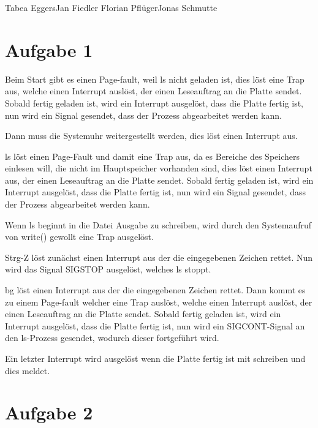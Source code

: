 \documentclass{ti2}
\begin{document}
%
                {Tabea Eggers}{Jan Fiedler}%
                {Florian Pflüger}{Jonas Schmutte}%


\section*{Aufgabe 1}
Beim Start gibt es einen Page-fault, weil ls nicht geladen ist, dies löst eine Trap aus, welche einen Interrupt auslöst, der einen Leseauftrag an die Platte sendet. Sobald fertig geladen ist, wird ein Interrupt ausgelöst, dass die Platte fertig ist, nun wird ein Signal gesendet, dass der Prozess abgearbeitet werden kann.%

Dann muss die Systemuhr weitergestellt werden, dies löst einen Interrupt aus. %

ls löst einen Page-Fault und damit eine Trap aus, da es Bereiche des Speichers einlesen will, die nicht im Hauptspeicher vorhanden sind, dies löst einen Interrupt aus, der einen Leseauftrag an die Platte sendet. Sobald fertig geladen ist, wird ein Interrupt ausgelöst, dass die Platte fertig ist, nun wird ein Signal gesendet, dass der Prozess abgearbeitet werden kann.%

Wenn ls beginnt in die Datei Ausgabe zu schreiben, wird durch den Systemaufruf von write() gewollt eine Trap ausgelöst.

Strg-Z löst zunächst einen Interrupt aus der die eingegebenen Zeichen rettet. Nun wird das Signal SIGSTOP ausgelöst, welches ls stoppt. %

bg löst einen Interrupt aus der die eingegebenen Zeichen rettet. Dann kommt es zu einem Page-fault welcher eine Trap auslöst, welche einen Interrupt auslöst, der einen Leseauftrag an die Platte sendet. Sobald fertig geladen ist, wird ein Interrupt ausgelöst, dass die Platte fertig ist, nun wird ein SIGCONT-Signal an den ls-Prozess gesendet, wodurch dieser fortgeführt wird. %

Ein letzter Interrupt wird ausgelöst wenn die Platte fertig ist mit schreiben und dies meldet. %

\section*{Aufgabe 2}
\end{document}
